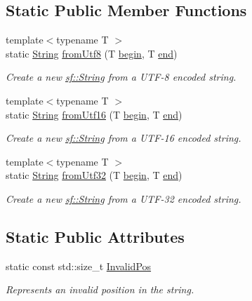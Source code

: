\subsection*{Static Public Member Functions}
\begin{DoxyCompactItemize}
\item 
{\footnotesize template$<$typename T $>$ }\\static \hyperlink{classsf_1_1_string}{String} \hyperlink{classsf_1_1_string_aa7beb7ae5b26e63dcbbfa390e27a9e4b}{from\+Utf8} (T \hyperlink{classsf_1_1_string_a8ec30ddc08e3a6bd11c99aed782f6dfe}{begin}, T \hyperlink{classsf_1_1_string_ac823012f39cb6f61100418876e99d53b}{end})
\begin{DoxyCompactList}\small\item\em Create a new \hyperlink{classsf_1_1_string}{sf\+::\+String} from a U\+T\+F-\/8 encoded string. \end{DoxyCompactList}\item 
{\footnotesize template$<$typename T $>$ }\\static \hyperlink{classsf_1_1_string}{String} \hyperlink{classsf_1_1_string_a81f70eecad0000a4f2e4d66f97b80300}{from\+Utf16} (T \hyperlink{classsf_1_1_string_a8ec30ddc08e3a6bd11c99aed782f6dfe}{begin}, T \hyperlink{classsf_1_1_string_ac823012f39cb6f61100418876e99d53b}{end})
\begin{DoxyCompactList}\small\item\em Create a new \hyperlink{classsf_1_1_string}{sf\+::\+String} from a U\+T\+F-\/16 encoded string. \end{DoxyCompactList}\item 
{\footnotesize template$<$typename T $>$ }\\static \hyperlink{classsf_1_1_string}{String} \hyperlink{classsf_1_1_string_ab023a4900dce37ee71ab9e29b30a23cb}{from\+Utf32} (T \hyperlink{classsf_1_1_string_a8ec30ddc08e3a6bd11c99aed782f6dfe}{begin}, T \hyperlink{classsf_1_1_string_ac823012f39cb6f61100418876e99d53b}{end})
\begin{DoxyCompactList}\small\item\em Create a new \hyperlink{classsf_1_1_string}{sf\+::\+String} from a U\+T\+F-\/32 encoded string. \end{DoxyCompactList}\end{DoxyCompactItemize}
\subsection*{Static Public Attributes}
\begin{DoxyCompactItemize}
\item 
\mbox{\label{classsf_1_1_string_abaadecaf12a6b41c54d725c75fd28527}} 
static const std\+::size\+\_\+t \hyperlink{classsf_1_1_string_abaadecaf12a6b41c54d725c75fd28527}{Invalid\+Pos}
\begin{DoxyCompactList}\small\item\em Represents an invalid position in the string. \end{DoxyCompactList}\end{DoxyCompactItemize}
